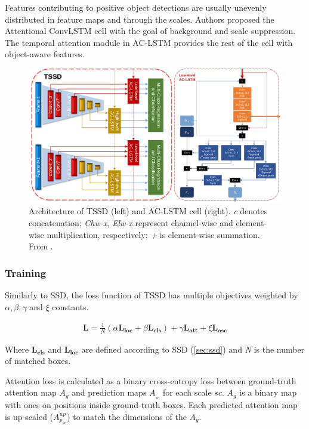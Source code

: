 Features contributing to positive object detections are usually unevenly distributed in feature maps and through the scales. Authors proposed the Attentional ConvLSTM cell with the goal of background and scale suppression.  The temporal attention module in AC-LSTM provides the rest of the cell with object-aware features. 

\begin{figure}
    \centering
    \includegraphics[width=\textwidth]{img/tssd}
    \caption[TSSD architecture and AC-LSTM cell]%
    {Architecture of TSSD (left) and {AC-LSTM} cell (right). \textit{c} denotes concatenation; \textit{Chw-x}, \textit{Elw-x} represent channel-wise and element-wise multiplication, respectively; \textit{+} is element-wise summation. From \cite[fig.~2,~3]{bib:tssd}.}
    \label{fig:tssd}
\end{figure}


\subsubsection{Training}
Similarly to SSD, the loss function of TSSD has multiple objectives weighted by $\alpha, \beta, \gamma$ and $\xi$ constants.

\begin{align*}
\mathbf{L} = \frac{1}{N}(\alpha\mathbf{L_{\text{loc}}} + \beta\mathbf{L_{\text{cls}}}) + \gamma\mathbf{L_{\text{att}}} + \xi\mathbf{L_{\text{asc}}}
\end{align*}


Where $\mathbf{L_{\text{cls}}}$ and $\mathbf{L_{\text{loc}}}$ are defined according to SSD (\cref{sec:ssd}) and \textit{N} is the number of matched boxes.

Attention loss is calculated as a binary cross-entropy loss between ground-truth attention map $A_g$ and prediction maps $A_{_{sc}}$ for each scale $sc$. $A_g$ is a binary map with ones on positions inside ground-truth boxes. Each predicted attention map is up-scaled ($A^{up}_{p_{sc}}$) to match the dimensions of the $A_g$.

